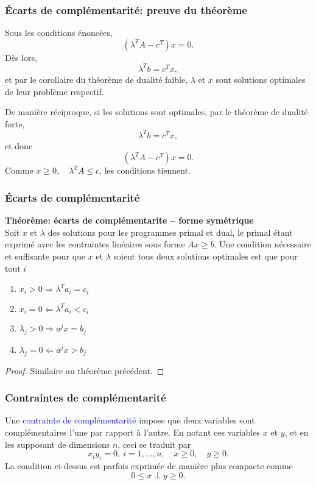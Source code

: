 \documentclass[usepdftitle=false]{beamer}
\begin{document}
\begin{frame}
\frametitle{\'Ecarts de complémentarité: preuve du théorème}

Sous les conditions énoncées,
\[
(\lambda^T A - c^T)x = 0.
\]
Dès lors,
\[
\lambda^T b = c^Tx,
\]
et par le corollaire du théorème de dualité faible, $\lambda$ et $x$ sont solutions optimales de leur problème respectif.

\mbox{}

De manière réciproque, si les solutions sont optimales, par le théorème de dualité forte,
\[
\lambda^T b = c^Tx,
\]
et donc
\[
(\lambda^T A - c^T) x = 0.
\]
Comme
$x \geq 0,\quad \lambda^T A \leq c$,
les conditions tiennent.

\end{frame}

\begin{frame}
\frametitle{\'Ecarts de complémentarité}

{\bf Théorème: écarts de complémentarite -- forme symétrique}\\
Soit $x$ et $\lambda$ des solutions pour les programmes primal et dual, le primal étant exprimé avec les contraintes linéaires sous forme $Ax \geq b$. Une condition nécessaire et suffisante pour que $x$ et $\lambda$ soient tous deux solutions optimales est que pour tout $i$
\begin{enumerate}
\item
$x_i > 0 \Rightarrow \lambda^T a_i = c_i$
\item
$x_i = 0 \Leftarrow \lambda^T a_i < c_i$
\item
$\lambda_j > 0 \Rightarrow a^j x = b_j$
\item
$\lambda_j = 0 \Leftarrow a^j x > b_j$
\end{enumerate}

\begin{proof}
Similaire au théorème précédent.
\end{proof}

\end{frame}

\begin{frame}
\frametitle{Contraintes de complémentarité}

Une \textcolor{blue}{contrainte de complémentarité} impose que deux variables sont complémentaires l'une par rapport à l'autre.
En notant ces variables $x$ et $y$, et en les supposant de dimensions $n$, ceci se traduit par
$$
x_iy_i = 0,\ i = 1,\ldots,n, \quad x \ge 0, \quad y \ge 0.
$$
La condition ci-dessus est parfois exprimée de manière plus compacte comme
$$
0 \leq x \perp y \geq 0.
$$

\end{frame}
\end{document}
